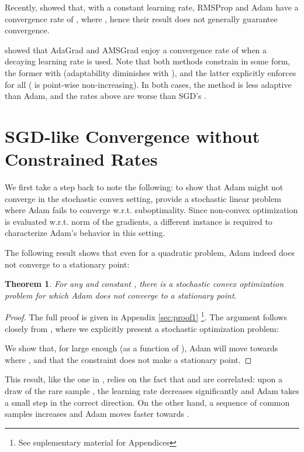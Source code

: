 \documentclass{article}
\newtheorem{thm}{Theorem}
\begin{document}
Recently, \citet{yogi} showed that, with a constant learning rate, RMSProp and Adam have a convergence rate of
, where
   ,
hence their result does not generally guarantee convergence. 

\citet{adamlike} showed that
AdaGrad and AMSGrad enjoy a convergence rate of  when a decaying learning rate is used. Note
that both methods constrain  in some form, the former with
    (adaptability diminishes with ),
and the latter explicitly enforces
    for all  ( is point-wise non-increasing).
In both cases, the method is less adaptive than Adam, and the rates above are worse than SGD's . \section{SGD-like Convergence without Constrained Rates}
\label{sec:dadam}



We first take a step back to note the following: to show that Adam might not
converge in the stochastic convex setting, \citet{amsgrad} provide a
stochastic linear problem where Adam fails to converge w.r.t. suboptimality.
Since non-convex optimization is evaluated w.r.t. norm of the gradients, a
different instance is required to characterize Adam's behavior in this setting.

The following result shows that even for a quadratic problem, Adam indeed does
not converge to a stationary point:

\begin{thm}
   For any  and constant , there is a
   stochastic convex optimization problem for which Adam does not converge to
   a stationary point.
   \label{thm:adamdiv}
\end{thm}
\begin{proof}
   The full proof is given in Appendix \ref{sec:proof1} \footnote{See suplementary material for Appendices}.  The argument follows
   closely from \citet{amsgrad}, where we explicitly present a stochastic
   optimization problem:
   
   We show that, for large enough  (as a function of
   ), Adam will move towards
    where , and that the constraint
    does not make  a stationary point.
\end{proof}

This result, like the one in \citet{amsgrad}, relies on the fact that 
and  are correlated: upon a draw of the rare sample , the
learning rate  decreases significantly and Adam takes a small step in
the correct direction.  On the other hand, a sequence of common samples
increases  and Adam moves faster towards .
\end{document}
